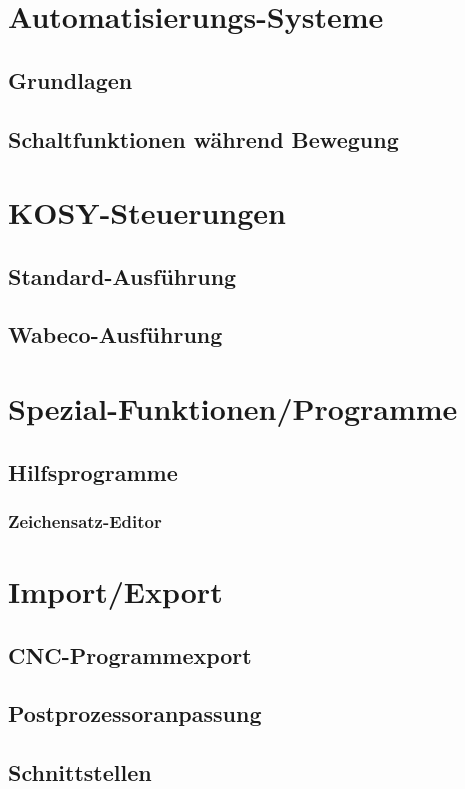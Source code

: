 \documentclass[a4paper]{book}
\begin{document}
\chapter{Automatisierungs-Systeme}
	\section{Grundlagen} 
	\section{Schaltfunktionen während Bewegung} 
 
\chapter{KOSY-Steuerungen} 
	\section{Standard-Ausführung} 
	\section{Wabeco-Ausführung} 

\chapter{Spezial-Funktionen/Programme} 
	\section{Hilfsprogramme} 
		\subsection{Zeichensatz-Editor} 

\chapter{Import/Export} 
	\section{CNC-Programmexport} 
	\section{Postprozessoranpassung} 
	\section{Schnittstellen} 
\end{document}
